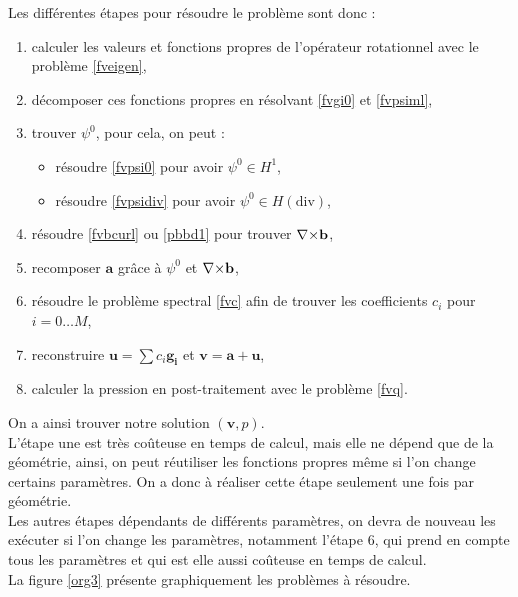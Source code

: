 Les différentes étapes pour résoudre le problème sont donc :
\begin{enumerate}
\item calculer les valeurs et fonctions propres de l'opérateur rotationnel avec le problème \ref{fveigen},
\item décomposer ces fonctions propres en résolvant \ref{fvgi0} et \ref{fvpsiml},
\item trouver $\psi^0$, pour cela, on peut :
\begin{itemize}
\item résoudre \ref{fvpsi0} pour avoir $\psi^0\in H^1$,
\item résoudre \ref{fvpsidiv} pour avoir $\psi^0\in H(\mathrm{div})$,
\end{itemize}
\item résoudre \ref{fvbcurl} ou \ref{pbbd1} pour trouver ${\nabla\times}\mathbf{b}$,
\item recomposer $\mathbf{a}$ grâce à $\psi^0$ et ${\nabla\times}\mathbf{b}$,
\item résoudre le problème spectral \ref{fvc} afin de trouver les coefficients $c_i$ pour $i=0\dots M$,
\item reconstruire $\mathbf{u}=\sum c_i \mathbf{g_i}$ et $\mathbf{v}=\mathbf{a}+\mathbf{u}$,
\item calculer la pression en post-traitement avec le problème \ref{fvq}.
\end{enumerate}

On a ainsi trouver notre solution $(\mathbf{v},p)$.\\
L'étape une est très coûteuse en temps de calcul, mais elle ne dépend que de la géométrie, ainsi, on peut réutiliser les fonctions propres même si l'on change certains paramètres. On a donc à réaliser cette étape seulement une fois par géométrie.\\
Les autres étapes dépendants de différents paramètres, on devra de nouveau les exécuter si l'on change les paramètres, notamment l'étape 6, qui prend en compte tous les paramètres et qui est elle aussi coûteuse en temps de calcul.\\

La figure \ref{org3} présente graphiquement les problèmes à résoudre.\\

